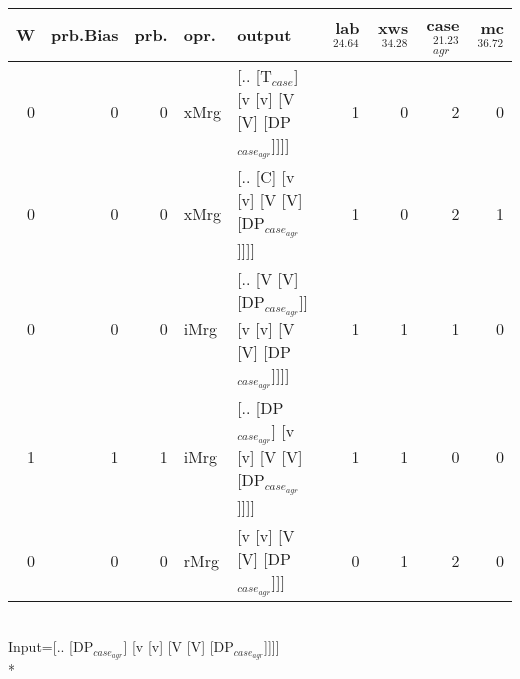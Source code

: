 \begin{tabularx}{\linewidth}{rrrlXrrrr}
\hline
   W &   prb.Bias &   prb. & opr.   & output                                                   &   lab$^{24.64}$ &   xws$^{34.28}$ &   case$_{agr}^{21.23}$ &   mc$^{36.72}$ \\
\hline
   0 &       0 &   0 & xMrg & [.. [T$_{case}$] [v [v] [V [V] [DP$_{case_{agr}}$]]]]              &             1 &             0 &                  2 &            0 \\
   0 &       0 &   0 & xMrg & [.. [C] [v [v] [V [V] [DP$_{case_{agr}}$]]]]                   &             1 &             0 &                  2 &            1 \\
   0 &       0 &   0 & iMrg & [.. [V [V] [DP$_{case_{agr}}$]] [v [v] [V [V] [DP$_{case_{agr}}$]]]] &             1 &             1 &                  1 &            0 \\
   1 &       1 &   1 & iMrg & [.. [DP$_{case_{agr}}$] [v [v] [V [V] [DP$_{case_{agr}}$]]]]         &             1 &             1 &                  0 &            0 \\
   0 &       0 &   0 & rMrg & [v [v] [V [V] [DP$_{case_{agr}}$]]]                            &             0 &             1 &                  2 &            0 \\
\hline
\end{tabularx}\endgroup\\
\begingroup\scriptsize Input=[.. [DP$_{case_{agr}}$] [v [v] [V [V] [DP$_{case_{agr}}$]]]]\\*

